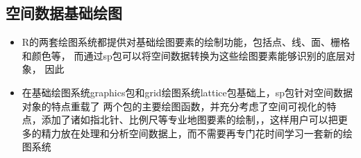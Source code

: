 
\subsection{空间数据基础绘图}
\begin{frame}[t]{\subsecname}
\begin{itemize} 
\item<1-> R的两套绘图系统都提供对基础绘图要素的绘制功能，包括点、线、面、栅格和颜色等，
而通过sp包可以将空间数据转换为这些绘图要素能够识别的底层对象，
因此
\item<2-> 在基础绘图系统graphics包和grid绘图系统lattice包基础上，sp包针对空间数据对象的特点重载了
两个包的主要绘图函数，并充分考虑了空间可视化的特点，添加了诸如指北针、比例尺等专业地图要素的绘制，，这样用户可以把更多的精力放在处理和分析空间数据上，而不需要再专门花时间学习一套新的绘图系统\end{itemize}
\end{frame}

